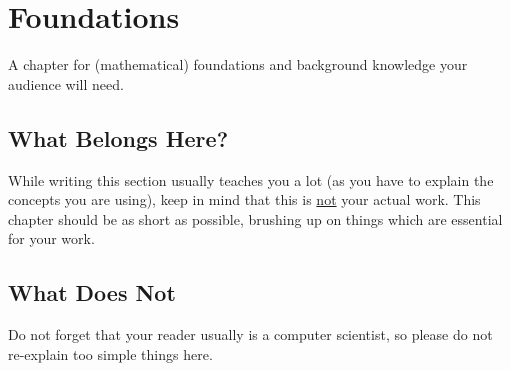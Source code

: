 

\chapter{Foundations}\label{chap:Foundations}
	A chapter for (mathematical) foundations and background knowledge your audience will need.
	
	\section{What Belongs Here?}
	While writing this section usually teaches you a lot (as you have to explain the concepts you are using), keep in mind that this is \underline{not} your actual work.
	This chapter should be as short as possible, brushing up on things which are essential for your work.
	
	\section{What Does Not}
	Do not forget that your reader usually is a computer scientist, so please do not re-explain too simple things here.
	
